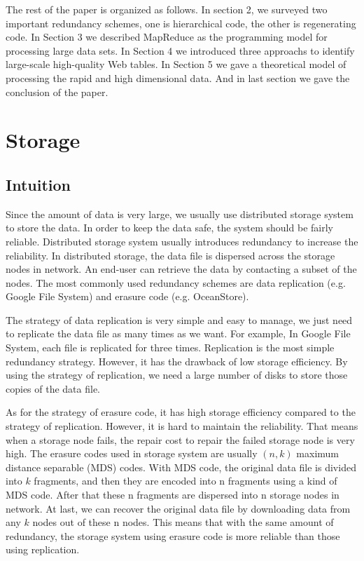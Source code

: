 \documentclass{article} %
\begin{document}
The rest of the paper is organized as follows. In section 2, we surveyed two important redundancy schemes, one is hierarchical code, the other is regenerating code. In Section 3 we described MapReduce as the programming model for processing large data sets. In Section 4 we introduced three approachs to identify large-scale high-quality Web tables. In Section 5 we gave a theoretical model of processing the rapid and high dimensional data. And in last section we gave the conclusion of the paper.

\section{Storage}
\subsection{Intuition}
Since the amount of data is very large, we usually use distributed storage system to store the data. In order to keep the data safe, the system should be fairly reliable. Distributed storage system usually introduces redundancy to increase the reliability. In distributed storage, the data file is dispersed across the storage nodes in network. An end-user can retrieve the data by contacting a subset of the nodes. The most commonly used redundancy schemes are data replication (e.g. Google File System) and erasure code (e.g. OceanStore).

The strategy of data replication is very simple and easy to manage, we just need to replicate the data file as many times as we want. For example, In Google File System, each file is replicated for three times. Replication is the most simple redundancy strategy. However, it has the drawback of low storage efficiency. By using the strategy of replication, we need a large number of disks to store those copies of the data file.

As for the strategy of erasure code, it has high storage efficiency compared to the strategy of replication. However, it is hard to maintain the reliability. That means when a storage node fails, the repair cost to repair the failed storage node is very high. The erasure codes used in storage system are usually $(n, k)$ maximum distance separable (MDS) codes. With MDS code, the original data file is divided into $k$ fragments, and then they are encoded into n fragments using a kind of MDS code. After that these n fragments are dispersed into n storage nodes in network. At last, we can recover the original data file by downloading data from any $k$ nodes out of these n nodes. This means that with the same amount of redundancy, the storage system using erasure code is more reliable than those using replication.
\end{document}
